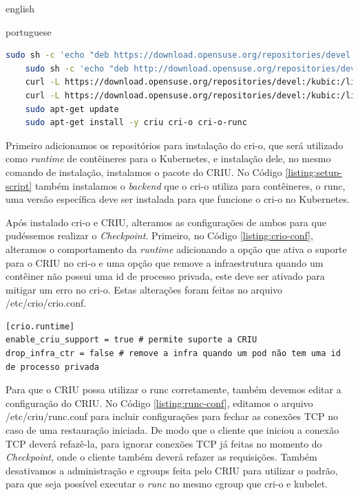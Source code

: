\begin{otherlanguage*}{english}
\begin{otherlanguage*}{portuguese}
\begin{lstlisting}[language=bash,caption={Comandos de configuração da máquina para CRIU e cri-o.},label={listing:setup-script}]
   sudo sh -c 'echo "deb https://download.opensuse.org/repositories/devel:/kubic:/libcontainers:/stable/xUbuntu_20.04/ /" > /etc/apt/sources.list.d/devel:kubic:libcontainers:stable.list'
	sudo sh -c 'echo "deb http://download.opensuse.org/repositories/devel:/kubic:/libcontainers:/stable:/cri-o:/1.25/xUbuntu_20.04/ /" > /etc/apt/sources.list.d/devel:kubic:libcontainers:stable:cri-o:$CRIO_VERSION.list'
	curl -L https://download.opensuse.org/repositories/devel:/kubic:/libcontainers:/stable:/cri-o:/1.25/xUbuntu_20.04/Release.key | sudo apt-key add -
	curl -L https://download.opensuse.org/repositories/devel:/kubic:/libcontainers:/stable/xUbuntu_20.04/Release.key | sudo apt-key add -
	sudo apt-get update
	sudo apt-get install -y criu cri-o cri-o-runc
\end{lstlisting}

Primeiro adicionamos os repositórios para instalação do cri-o, que será utilizado como
\textit{runtime} de contêineres para o Kubernetes, e instalação dele, no mesmo comando
de instalação, instalamos o pacote do CRIU. No Código \ref{listing:setup-script} também
instalamos o \textit{backend} que o cri-o utiliza para contêineres, o runc, uma versão
específica deve ser instalada para que funcione o cri-o no Kubernetes.

Após instalado cri-o e CRIU, alteramos as configurações de ambos para que pudéssemos
realizar o \textit{Checkpoint}. Primeiro, no Código \ref{listing:crio-conf}, alteramos
o comportamento da \textit{runtime} adicionando a opção que ativa o suporte para o CRIU
no cri-o e uma opção que remove a infraestrutura quando um contêiner não possui uma id de
processo privada, este deve ser ativado para mitigar um erro no cri-o. Estas alterações
foram feitas no arquivo /etc/crio/crio.conf.

\begin{lstlisting}[language=plaintext,caption={Configuração a ser incluída no arquivo de configurações do cri-o.},label={listing:crio-conf}]
[crio.runtime]
enable_criu_support = true # permite suporte a CRIU
drop_infra_ctr = false # remove a infra quando um pod não tem uma id de processo privada
\end{lstlisting}

Para que o CRIU possa utilizar o runc corretamente, também devemos editar a configuração
do CRIU. No Código \ref{listing:runc-conf}, editamos o arquivo /etc/criu/runc.conf para 
incluir configurações para fechar as conexões TCP no caso de uma restauração iniciada.
De modo que o cliente que iniciou a conexão TCP deverá refazê-la, para ignorar conexões
TCP já feitas no momento do \textit{Checkpoint}, onde o cliente também deverá refazer as
requisições. Também desativamos a administração e cgroups feita pelo CRIU para utilizar o padrão,
para que seja possível executar o \textit{runc} no mesmo cgroup que cri-o e kubelet.


\end{otherlanguage*}
\end{otherlanguage*}

